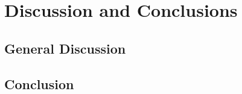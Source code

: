 \documentclass{book}
\begin{document}
	\part{Discussion and Conclusions}
	\chapter{General Discussion}
	\chapter{Conclusion}
	
\end{document}
